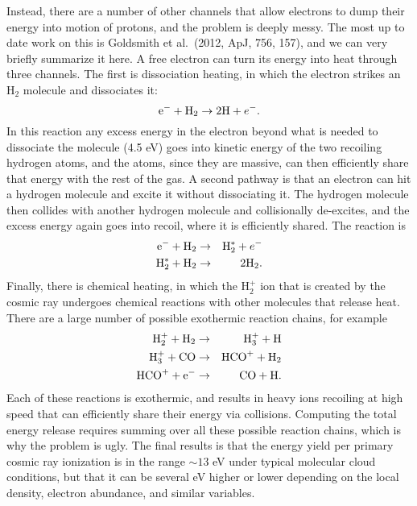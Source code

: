 Instead, there are a number of other channels that allow electrons to dump their energy into motion of protons, and the problem is deeply messy. The most up to date work on this is Goldsmith et al.~(2012, ApJ, 756, 157), and we can very briefly summarize it here. A free electron can turn its energy into heat through three channels. The first is dissociation heating, in which the electron strikes an H$_2$ molecule and dissociates it:
\begin{equation}
\mbox{e}^- + {\rm H}_2 \rightarrow 2{\rm H} + e^{-}.
\end{equation}
In this reaction any excess energy in the electron beyond what is needed to dissociate the molecule (4.5 eV) goes into kinetic energy of the two recoiling hydrogen atoms, and the atoms, since they are massive, can then efficiently share that energy with the rest of the gas. A second pathway is that an electron can hit a hydrogen molecule and excite it without dissociating it. The hydrogen molecule then collides with another hydrogen molecule and collisionally de-excites, and the excess energy again goes into recoil, where it is efficiently shared. The reaction is
\begin{eqnarray}
\mbox{e}^- + {\rm H}_2 & \rightarrow & {\rm H}_2^* + e^{-} \\
{\rm H}_2^* + {\rm H}_2 & \rightarrow & 2 {\rm H}_2.
\end{eqnarray}
Finally, there is chemical heating, in which the H$_2^+$ ion that is created by the cosmic ray undergoes chemical reactions with other molecules that release heat. There are a large number of possible exothermic reaction chains, for example
\begin{eqnarray}
{\rm H}_2^+ + {\rm H}_2 & \rightarrow & {\rm H}_3^+ + {\rm H} \\
{\rm H}_3^+ + {\rm CO} & \rightarrow & {\rm HCO}^+ + {\rm H}_2 \\
{\rm HCO}^+ + {\rm e}^- & \rightarrow & {\rm CO} + {\rm H}.
\end{eqnarray}
Each of these reactions is exothermic, and results in heavy ions recoiling at high speed that can efficiently share their energy via collisions. Computing the total energy release requires summing over all these possible reaction chains, which is why the problem is ugly. The final results is that the energy yield per primary cosmic ray ionization is in the range $\sim 13$ eV under typical molecular cloud conditions, but that it can be several eV higher or lower depending on the local density, electron abundance, and similar variables.

